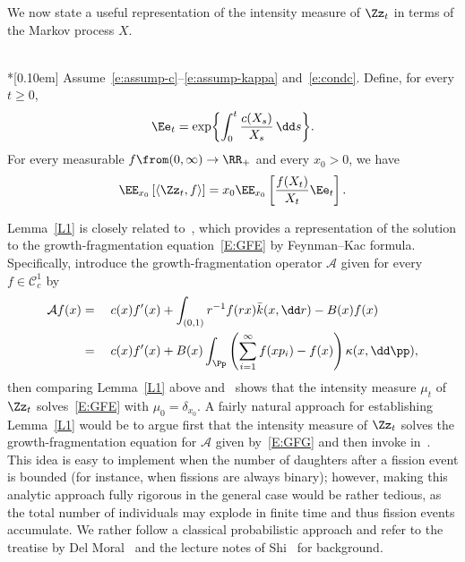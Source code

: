 We now state a useful representation of the intensity measure of $\Zz_t$ in terms of the Markov process $X$.


\begin{lemm} \label{L1}\ \\*[0.10em]
Assume~\eqref{e:assump-c}--\eqref{e:assump-kappa} and~\eqref{e:condc}. Define, for every $t\geq 0$,
\[
\Ee_t = \exp\biggl\{\int_0^t \frac{c(X_s)}{X_s} \, \dd s\biggr\}.
\]
For every measurable $f\from (0,\infty)\to \RR_+$ and every $x_0>0$, we have
\[
\EE_{x_0} \left[\langle \Zz_t, f\rangle \right] = x_0\EE_{x_0}\left[\frac{f(X_t)}{X_t}\Ee_t \right].
\]
\end{lemm}

Lemma~\ref{L1} is closely related to~\cite[Lemma~2.2]{BW}, which provides a representation of the solution to the growth-fragmentation equation~\eqref{E:GFE} by Feynman--Kac formula. Specifically, introduce the growth-fragmentation operator ${\mathcal A}$ given for every $f\in{\mathcal C}^1_c$ by
\begin{equation}\label{E:GFG}
\begin{aligned}
{\mathcal A}f(x) &=\quad c(x) f'(x) + \int_{(0,1)} r^{-1} f(rx) \bar k(x, \dd r) -{B}(x) f(x)  \\
&=\quad c(x) f'(x) + {B}(x) \int_{\Pp} \left(\sum_{i=1}^{\infty}f(xp_i)-f(x)\right)\kappa(x, \dd \pp),
\end{aligned}
\end{equation}
then comparing Lemma~\ref{L1} above and~\cite[Lemma~2.2]{BW} shows that the intensity measure $\mu_t$ of $\Zz_t$ solves~\eqref{E:GFE} with $\mu_0=\delta_{x_0}$. A fairly natural approach for establishing Lemma~\ref{L1} would be to argue first that the intensity measure of $\Zz_t$ solves the growth-fragmentation equation for ${\mathcal A}$ given by~\eqref{E:GFG} and then invoke in~\cite[Lemma~2.2]{BW}. This idea is easy to implement when the number of daughters after a fission event is bounded (for instance, when fissions are always binary); however, making this analytic approach fully rigorous in the general case would be rather tedious, as the total number of individuals may explode in finite time and thus fission events accumulate. We rather follow a classical probabilistic approach and refer to the treatise by Del Moral~\cite{Delmoral} and the lecture notes of Shi~\cite{Shi} for background.

